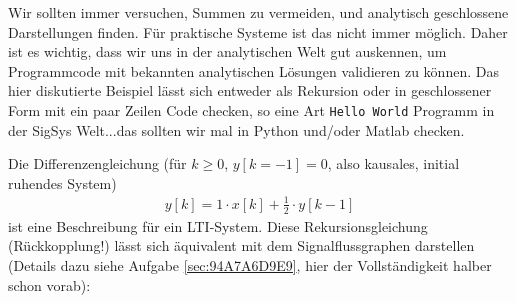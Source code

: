 \begin{ExCalc}
Wir sollten immer versuchen, Summen zu vermeiden, und analytisch geschlossene
Darstellungen finden. Für praktische Systeme ist das nicht immer möglich.
Daher ist es wichtig, dass wir uns in der analytischen Welt gut auskennen, um
Programmcode mit bekannten analytischen Lösungen validieren zu können.
%
Das hier diskutierte Beispiel lässt sich entweder als Rekursion oder in geschlossener
Form mit ein paar Zeilen Code checken, so eine Art \texttt{Hello World} Programm
in der SigSys Welt...das sollten wir mal in Python und/oder Matlab checken.
\end{ExCalc}
\begin{Loesung}
Die Differenzengleichung (für $k\geq 0$, $y[k=-1]=0$, also kausales, initial ruhendes System)
\begin{align}
y[k] = 1 \cdot x[k] + \frac{1}{2} \cdot y[k-1]
\end{align}
ist eine Beschreibung für ein LTI-System. Diese Rekursionsgleichung (Rückkopplung!)
lässt sich äquivalent mit dem Signalflussgraphen darstellen
(Details dazu siehe Aufgabe \ref{sec:94A7A6D9E9}, hier der Vollständigkeit halber
schon vorab):
%
\begin{center}
\end{center}
%


\end{Loesung}
